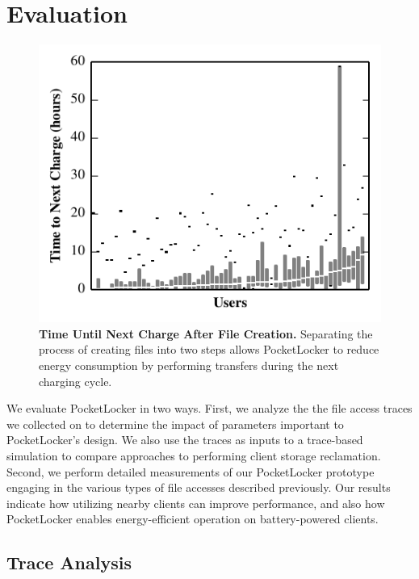 
\section{Evaluation}
\label{sec-evaluation}

\begin{figure}[t]
  \includegraphics{./figures/pocketlocker/BatteryLengthDistributionGraph.pdf}
  
  \caption{\small \textbf{Time Until Next Charge After File Creation.}
    Separating the process of creating files into two steps allows
  PocketLocker to reduce energy consumption by performing transfers during
the next charging cycle.}
  
  \label{fig-simulation-battery}

  \vspace*{-0.2in}
\end{figure}

We evaluate PocketLocker in two ways. First, we analyze the the file access
traces we collected on \PhoneLab{} to determine the impact of parameters
important to PocketLocker's design. We also use the traces as inputs to a
trace-based simulation to compare approaches to performing client storage
reclamation. Second, we perform detailed measurements of our PocketLocker
prototype engaging in the various types of file accesses described previously.
Our results indicate how utilizing nearby clients can improve performance, and
also how PocketLocker enables energy-efficient operation on battery-powered
clients.

\subsection{Trace Analysis}
\label{subsec-evaluation-traces}

